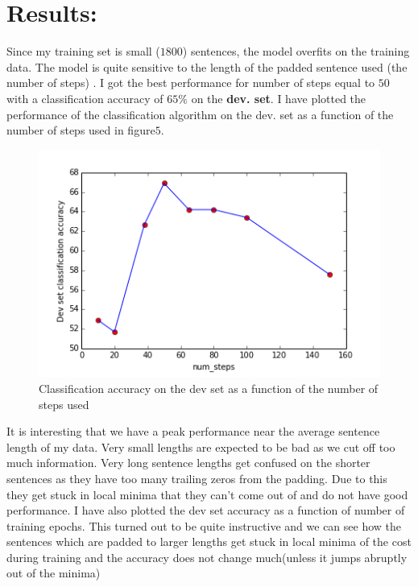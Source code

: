 \documentclass{article} %
\begin{document}
\section{Results:}
Since my training set is small ($1800$) sentences, the model overfits on the training data. The model is quite sensitive to the length of the padded sentence used (the number of steps) . I got the best performance for number of steps equal to $50$ with a classification accuracy of $65 \%$ on the \textbf {dev. set}.
I have plotted the performance of the classification algorithm on the dev. set as a function of the number of steps used in figure$5$.
\begin{figure}[h]
\begin{center}
\includegraphics[width = 0.8\linewidth]{classification_accuracy.png}
\end{center}
\caption{Classification accuracy on the dev set as a function of the number of steps used}
\end{figure}

It is interesting that we have a peak performance near the average sentence length of my data. Very small lengths are expected to be bad 
as we cut off too much information. Very long sentence lengths get confused on the shorter sentences as they have too many trailing zeros from the padding. Due to this they get stuck in local minima that they can't come out of and do not have good performance. I have also plotted the dev set accuracy as a function of number of training epochs. This turned out to be quite instructive and we can see how the sentences which are padded to larger lengths get stuck in local minima of the cost during training and the accuracy does not change much(unless it jumps abruptly out of the minima)\\
\end{document}
